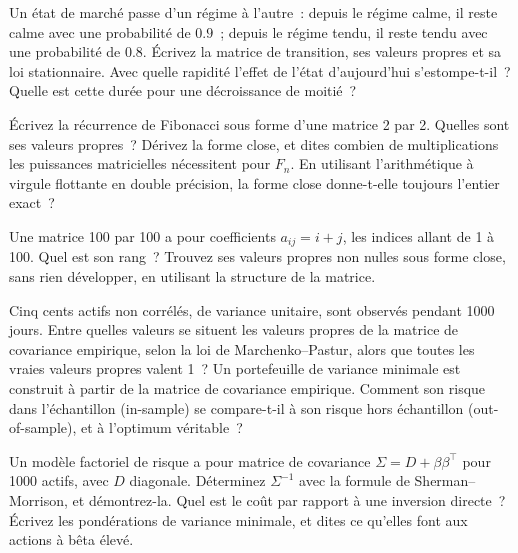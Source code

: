 \begin{question}\label{iq:iv1:linear-algebra:15}
Un état de marché passe d'un régime à l'autre~: depuis le régime calme, il reste calme avec une probabilité de $0.9$~; depuis le régime tendu, il reste tendu avec une probabilité de $0.8$. Écrivez la matrice de transition, ses valeurs propres et sa loi stationnaire. Avec quelle rapidité l'effet de l'état d'aujourd'hui s'estompe-t-il~? Quelle est cette durée pour une décroissance de moitié~?
\end{question}

\begin{question}\label{iq:iv1:linear-algebra:16}
Écrivez la récurrence de Fibonacci sous forme d'une matrice 2 par 2. Quelles sont ses valeurs propres~? Dérivez la forme close, et dites combien de multiplications les puissances matricielles nécessitent pour $F_n$. En utilisant l'arithmétique à virgule flottante en double précision, la forme close donne-t-elle toujours l'entier exact~?
\end{question}

\begin{question}\label{iq:iv1:linear-algebra:17}
Une matrice 100 par 100 a pour coefficients $a_{ij} = i + j$, les indices allant de 1 à 100. Quel est son rang~? Trouvez ses valeurs propres non nulles sous forme close, sans rien développer, en utilisant la structure de la matrice.
\end{question}

\begin{question}\label{iq:iv1:linear-algebra:18}
Cinq cents actifs non corrélés, de variance unitaire, sont observés pendant 1000 jours. Entre quelles valeurs se situent les valeurs propres de la matrice de covariance empirique, selon la loi de Marchenko--Pastur, alors que toutes les vraies valeurs propres valent 1~? Un portefeuille de variance minimale est construit à partir de la matrice de covariance empirique. Comment son risque dans l'échantillon (in-sample) se compare-t-il à son risque hors échantillon (out-of-sample), et à l'optimum véritable~?
\end{question}

\begin{question}\label{iq:iv1:linear-algebra:19}
Un modèle factoriel de risque a pour matrice de covariance $\Sigma = D + \beta\beta^\top$ pour 1000 actifs, avec $D$ diagonale. Déterminez $\Sigma^{-1}$ avec la formule de Sherman--Morrison, et démontrez-la. Quel est le coût par rapport à une inversion directe~? Écrivez les pondérations de variance minimale, et dites ce qu'elles font aux actions à bêta élevé.
\end{question}

